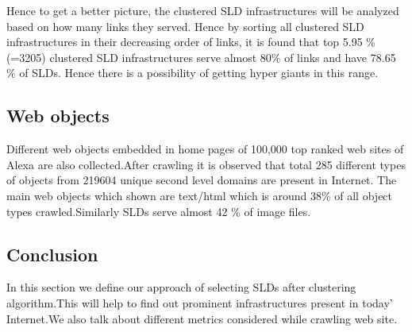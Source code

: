 Hence to get a better picture, the clustered SLD infrastructures will be analyzed based on how many links they served. Hence by sorting all clustered SLD infrastructures in their decreasing order of links, it is found that top 5.95 \% (=3205) clustered SLD infrastructures serve almost 80\% of links and have 78.65 \% of SLDs. Hence there is a possibility of getting hyper giants in this range.

\subsection{Web objects}
Different web objects embedded in home pages of 100,000 top ranked web sites of Alexa are also collected.After crawling it is observed that total 285 different types of objects from 219604 unique second level domains are present in Internet. The main web objects which shown are text/html which is around 38\% of all object types crawled.Similarly SLDs serve almost 42 \% of image files.

\subsection{Conclusion}
In this section we define our approach of selecting SLDs after clustering algorithm.This will help to find out prominent infrastructures present in today' Internet.We also talk about different metrics considered while crawling web site.